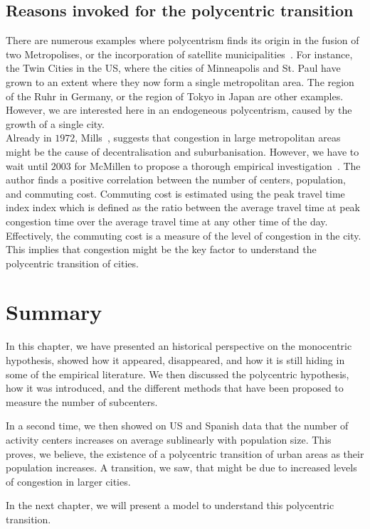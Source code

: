 \subsection{Reasons invoked for the polycentric transition}
\label{sec:reasons_invoked_for_the_polycentric_transition}

There are numerous examples where polycentrism finds its origin in the fusion of two
Metropolises, or the incorporation of satellite municipalities~\cite{LeNechet:2015}. For instance, the Twin Cities in the US, where the cities of
Minneapolis and St. Paul have grown to an extent where they now form a single
metropolitan area. The region of the Ruhr in Germany, or the region of Tokyo in
Japan are other examples. However, we are interested here in an endogeneous
polycentrism, caused by the growth of a single city.\\

Already in $1972$, Mills~\cite{Mills:1972}, suggests that congestion in large
metropolitan areas might be the cause of decentralisation and suburbanisation.
However, we have to wait until $2003$ for McMillen to propose a thorough
empirical investigation~\cite{McMillen:2003}. The author finds a positive
correlation between the number of centers, population, and commuting cost.
Commuting cost is estimated using the peak travel time index index which is
defined as the ratio between the average travel time at peak congestion time
over the average travel time at any other time of the day.  Effectively, the
commuting cost is a measure of the level of congestion in the city.  This
implies that congestion might be the key factor to understand the polycentric
transition of cities.

\section{Summary}
\label{sec:summary}

In this chapter, we have presented an historical perspective on the monocentric
hypothesis, showed how it appeared, disappeared, and how it is still hiding in 
some of the empirical literature. We then discussed the polycentric hypothesis,
how it was introduced, and the different methods that have been proposed to
measure the number of subcenters.

In a second time, we then showed on US and Spanish data that the number of
activity centers increases on average sublinearly with population size. This
proves, we believe, the existence of a polycentric transition of urban areas as
their population increases. A transition, we saw, that might be due to increased levels
of congestion in larger cities.

In the next chapter, we will present a model to understand this polycentric
transition. 

